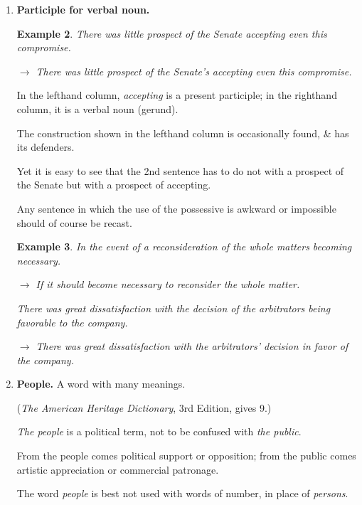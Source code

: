\documentclass{article}
\newtheorem{example}{Example}
\begin{document}
\begin{enumerate}
	{\it Partly} carries the idea of a part as distinct from the whole - usually a physical object.
	\begin{example}
		The log was partially submerged.
		
		$\to$ The log was partly submerged.
		
		She was partially in \& partially out.
		
		$\to$ She was partly in \& partly out./She was part in, part out.
	\end{example}
	\item {\bf Participle for verbal noun.}
	\begin{example}
		There was little prospect of the Senate accepting even this compromise.
		
		$\to$ There was little prospect of the Senate's accepting even this compromise.
	\end{example}
	In the lefthand column, {\it accepting} is a present participle; in the righthand column, it is a verbal noun (gerund).
	
	The construction shown in the lefthand column is occasionally found, \& has its defenders.
	
	Yet it is easy to see that the 2nd sentence has to do not with a prospect of the Senate but with a prospect of accepting.
	
	Any sentence in which the use of the possessive is awkward or impossible should of course be recast.
	\begin{example}
		In the event of a reconsideration of the whole matters becoming necessary.
		
		$\to$ If it should become necessary to reconsider the whole matter.
		
		There was great dissatisfaction with the decision of the arbitrators being favorable to the company.
		
		$\to$ There was great dissatisfaction with the arbitrators' decision in favor of the company.
	\end{example}
	\item {\bf People.} A word with many meanings.
	
	({\it The American Heritage Dictionary}, 3rd Edition, gives 9.)
	
	{\it The people} is a political term, not to be confused with {\it the public}.
	
	From the people comes political support or opposition; from the public comes artistic appreciation or commercial patronage.
	
	The word {\it people} is best not used with words of number, in place of {\it persons}.
	

\end{enumerate}
\end{document}
